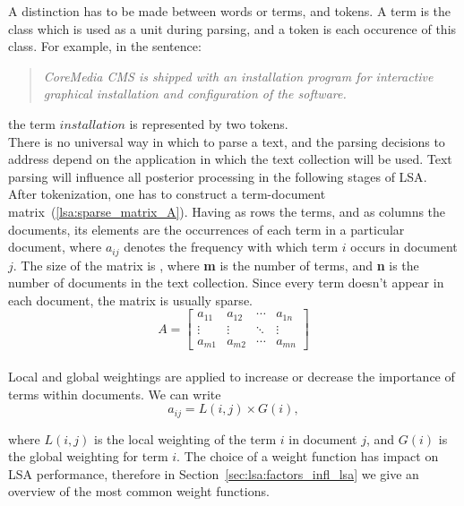 A distinction has to be made between words or terms, and tokens. A term is the class which is used as a unit during parsing, and a token is each occurence of this class. For example, in the sentence: 

\begin{quote}
\textit{CoreMedia CMS is shipped with an installation program for interactive graphical installation and configuration of the software.}
\end{quote}

the term $ installation $ is represented by two tokens. \\

There is no universal way in which to parse a text, and the parsing decisions to address depend on the application in which the text collection will be used. Text parsing will influence all posterior processing in the following stages of \gls{LSA}. \\

After tokenization, one has to construct a term-document matrix~(\ref{lsa:sparse_matrix_A}). Having as rows the terms, and as columns the documents, its elements are the occurrences of each term in a particular document, where $ a_{ij} $ denotes the frequency with which term $ i $ occurs in document $ j $. The size of the matrix is , where {\bf m} is the number of terms, and {\bf n} is the number of documents in the text collection. Since every term doesn't appear in each document, the matrix is usually sparse. \\

%
%
\begin{equation}
A=
\begin{bmatrix}
\label{lsa:sparse_matrix_A}
 a_{11}& a_{12}& \cdots& a_{1n} \\
 \vdots& \vdots& \ddots& \vdots \\ 
 a_{m1}& a_{m2}& \cdots& a_{mn}
\end{bmatrix}
\end{equation}\\

Local and global weightings are applied to increase or decrease the importance of terms within documents. We can write
%
%
\begin{equation}
\label{lsa:global_local_weighting}
a_{ij}=L(i,j) \times G(i),
\end{equation}

where $L(i,j)$ is the local weighting of the term $i$ in document $j$, and $G(i)$ is the global weighting for term $i$. The choice of a weight function has impact on \gls{LSA} performance, therefore in Section~\ref{sec:lsa:factors_infl_lsa} we give an overview of the most common weight functions. \\

